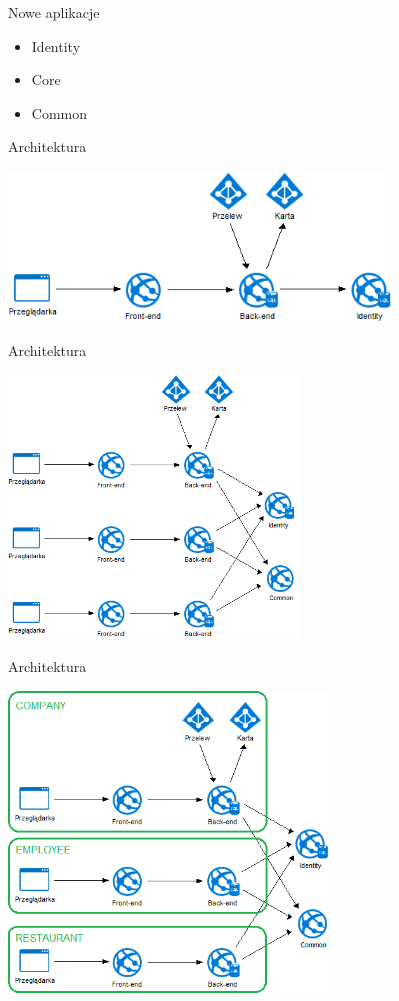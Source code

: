 \documentclass{beamer}
\begin{document}
\begin{frame}{Nowe aplikacje}
	\begin{huge}
		\begin{itemize}[<+->]
			\item Identity
			\item Core
			\item Common
		\end{itemize}
	\end{huge}
\end{frame}

\begin{frame}{Architektura}
	\begin{center}
		\includegraphics[height=4cm]{architektura1.png}
	\end{center}
\end{frame}

\begin{frame}{Architektura}
	\begin{center}
		\includegraphics[height=7cm]{architektura2.png}
	\end{center}
\end{frame}

\begin{frame}{Architektura}
	\begin{center}
		\includegraphics[height=8cm]{architektura4.png}
	\end{center}
\end{frame}
\end{document}
